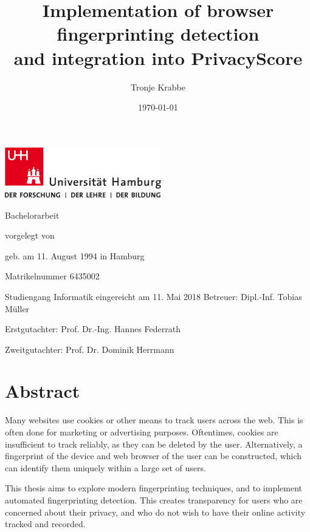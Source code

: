 \documentclass[
    fontsize=12pt,
    headings=small,
    parskip=half,
    bibliography=totoc,
    numbers=noenddot,
    open=any
    ]{scrreprt}
\title{
    Implementation of browser fingerprinting detection \\
    and integration into PrivacyScore
}
\author{Tronje Krabbe}
\date{\today}
\begin{document}
\hypersetup{hidelinks}

\frenchspacing


\newpage
\thispagestyle{empty}
\begin{titlepage}%
\includegraphics[width=6.8cm]{images/up-uhh-logo-u-2010-u-farbe-u-rgb.pdf}
\begin{center}\Large
	\vfill
	Bachelorarbeit
	\vfill
	\makeatletter
	{\Large\textsf{\textbf{\@title}}\par}
	\makeatother
	\vfill
	vorgelegt von
	\par\bigskip
	\makeatletter
	{\@author} \par
	\makeatother
	geb. am 11. August 1994 in Hamburg \par
	Matrikelnummer 6435002 \par
	Studiengang Informatik
	\vfill
	\makeatletter
	eingereicht am 11. Mai 2018
	\makeatother
	\vfill
	Betreuer: Dipl.-Inf. Tobias Müller \par
	Erstgutachter: Prof. Dr.-Ing. Hannes Federrath \par
	Zweitgutachter: Prof. Dr. Dominik Herrmann
\end{center}
\end{titlepage}%

\null\newpage

\chapter*{Abstract}
Many websites use cookies or other means to track users across the web. This is often
done for marketing or advertising purposes. Oftentimes, cookies are insufficient to track reliably,
as they can be deleted by the user. Alternatively, a fingerprint
of the device and web browser of the user can be constructed, which can identify them uniquely
within a large set of users.

This thesis aims to explore modern fingerprinting techniques, and to implement
automated fingerprinting detection. This creates transparency for users
who are concerned about their privacy, and who do not wish to have their online
activity tracked and recorded.
\end{document}
